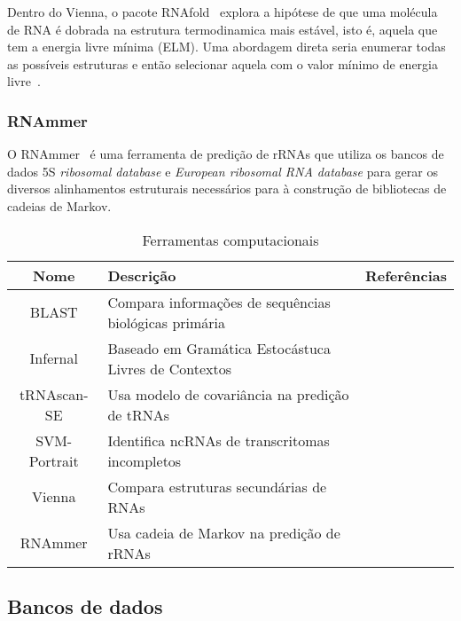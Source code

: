 Dentro do Vienna, o pacote RNAfold~\citep{hofacker2003vienna:2003} explora a hipótese de que uma molécula de RNA é dobrada na estrutura termodinamica mais estável, isto é, aquela que tem a energia livre mínima (ELM). Uma abordagem direta seria enumerar todas as possíveis estruturas e então selecionar aquela com o valor mínimo de energia livre~\citep{pipas1975method:1975}.   


\subsubsection*{RNAmmer}

O RNAmmer~\citep{lagesen2007rnammer:2007} é uma ferramenta de predição de rRNAs que utiliza os bancos de dados 5S \textit{ribosomal database} e \textit{European ribosomal RNA database} para gerar os diversos alinhamentos estruturais necessários para à construção de bibliotecas de cadeias de Markov. 


\begin{table}[ht]
 \caption{Ferramentas computacionais} \label{fig:FerrRNAs}\begin{tabular}{|c|l|l|}
\hline
\textbf{Nome} &  \textbf{Descrição}   & \textbf{Referências} \\ \hline
BLAST & Compara informações de sequências biológicas primária &~\citep{altschul1990basic:1990}\\ \hline
Infernal & Baseado em Gramática Estocástuca Livres de Contextos &~\citep{eddy1994rna:1994} \\ \hline
tRNAscan-SE & Usa modelo de covariância na predição de tRNAs&~\citep{lowe1997trnascan:1997}  \\ \hline
SVM-Portrait & Identifica ncRNAs de transcritomas incompletos &~\citep{Arrial:2006}  \\ \hline
Vienna &  Compara estruturas secundárias de RNAs &~\citep{hofacker1994fast:1994}\\ \hline
RNAmmer & Usa cadeia de Markov na predição de rRNAs&~\citep{lagesen2007rnammer:2007}\\ \hline
\end{tabular}
\label{}
\end{table} 


\subsection{Bancos de dados} \label{sec:bd-ncRNA}

